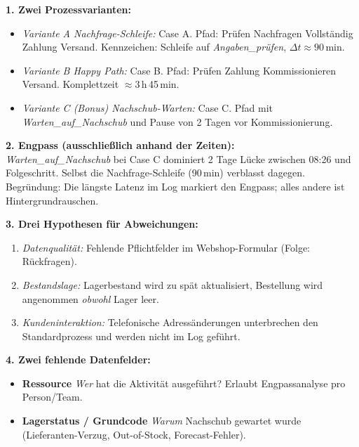 \documentclass[11pt,a4paper,oneside]{article}
\newcommand{\fachbegriff}[1]{\textbf{#1}}
\begin{document}
\begin{loesungbox}
\textbf{1. Zwei Prozessvarianten:}
\begin{itemize}
  \item \emph{Variante A \textendash{} Nachfrage-Schleife:} Case A. Pfad: Pr\"ufen \textrightarrow{} Nachfragen \textrightarrow{} Vollst\"andig \textrightarrow{} Zahlung \textrightarrow{} Versand. Kennzeichen: Schleife auf \emph{Angaben\_pr\"ufen}, $\Delta t \approx 90$\,min.
  \item \emph{Variante B \textendash{} Happy Path:} Case B. Pfad: Pr\"ufen \textrightarrow{} Zahlung \textrightarrow{} Kommissionieren \textrightarrow{} Versand. Komplettzeit $\approx 3\,$h\,45\,min.
  \item \emph{Variante C (Bonus) \textendash{} Nachschub-Warten:} Case C. Pfad mit \emph{Warten\_auf\_Nachschub} und Pause von 2 Tagen vor Kommissionierung.
\end{itemize}

\smallskip
\textbf{2. Engpass (ausschlie{\ss}lich anhand der Zeiten):}\\
\emph{Warten\_auf\_Nachschub} bei Case C dominiert \textendash{} 2 Tage L\"ucke zwischen 08:26 und Folgeschritt. Selbst die Nachfrage-Schleife (90\,min) verblasst dagegen. Begr\"undung: Die l\"angste Latenz im Log markiert den Engpass; alles andere ist Hintergrundrauschen.

\smallskip
\textbf{3. Drei Hypothesen f\"ur Abweichungen:}
\begin{enumerate}
  \item \emph{Datenqualit\"at:} Fehlende Pflichtfelder im Webshop-Formular (Folge: R\"uckfragen).
  \item \emph{Bestandslage:} Lagerbestand wird zu sp\"at aktualisiert, Bestellung wird angenommen \emph{obwohl} Lager leer.
  \item \emph{Kundeninteraktion:} Telefonische Adress\"anderungen unterbrechen den Standardprozess und werden nicht im Log gef\"uhrt.
\end{enumerate}

\smallskip
\textbf{4. Zwei fehlende Datenfelder:}
\begin{itemize}
  \item \fachbegriff{Ressource} \textendash{} \emph{Wer} hat die Aktivit\"at ausgef\"uhrt? Erlaubt Engpassanalyse pro Person/Team.
  \item \fachbegriff{Lagerstatus / Grundcode} \textendash{} \emph{Warum} Nachschub gewartet wurde (Lieferanten-Verzug, Out-of-Stock, Forecast-Fehler).
\end{itemize}
\end{loesungbox}
\end{document}
